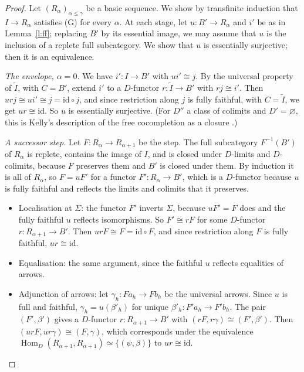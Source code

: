 \documentclass[11pt,a4paper]{amsart}
\theoremstyle{definition}
\theoremstyle{remark}
\newcommand{\Hom}{\operatorname{Hom}}
\begin{document}
\begin{proof}
Let $(R_\alpha)_{\alpha\le\gamma}$ be a basic sequence. We show by transfinite induction that $I\to R_\alpha$ satisfies (G) for every $\alpha$. At each stage, let $u\colon B'\to R_\alpha$ and $i'$ be as in Lemma~\ref{l:ff}; replacing $B'$ by its essential image, we may assume that $u$ is the inclusion of a replete full subcategory. We show that $u$ is essentially surjective; then it is an equivalence.

\emph{The envelope, $\alpha=0$.} We have $i'\colon I\to B'$ with $ui'\cong j$. By the universal property of $\widetilde I$, with $C=B'$, extend $i'$ to a $D$-functor $r\colon\widetilde I\to B'$ with $rj\cong i'$. Then $urj\cong ui'\cong j=\mathrm{id}\circ j$, and since restriction along $j$ is fully faithful, with $C=\widetilde I$, we get $ur\cong\mathrm{id}$. So $u$ is essentially surjective. (For $D''$ a class of colimits and $D'=\varnothing$, this is Kelly's description of the free cocompletion as a closure \cite[Thm~5.35]{kellybook}.)

\emph{A successor step.} Let $F\colon R_\alpha\to R_{\alpha+1}$ be the step. The full subcategory $F^{-1}(B')$ of $R_\alpha$ is replete, contains the image of $I$, and is closed under $D$-limits and $D$-colimits, because $F$ preserves them and $B'$ is closed under them. By induction it is all of $R_\alpha$, so $F=uF'$ for a functor $F'\colon R_\alpha\to B'$, which is a $D$-functor because $u$ is fully faithful and reflects the limits and colimits that it preserves.
\begin{itemize}
\item Localisation at $\Sigma$: the functor $F'$ inverts $\Sigma$, because $uF'=F$ does and the fully faithful $u$ reflects isomorphisms. So $F'\cong rF$ for some $D$-functor $r\colon R_{\alpha+1}\to B'$. Then $urF\cong F=\mathrm{id}\circ F$, and since restriction along $F$ is fully faithful, $ur\cong\mathrm{id}$.
\item Equalisation: the same argument, since the faithful $u$ reflects equalities of arrows.
\item Adjunction of arrows: let $\gamma_h\colon Fa_h\to Fb_h$ be the universal arrows. Since $u$ is full and faithful, $\gamma_h=u(\beta'_h)$ for unique $\beta'_h\colon F'a_h\to F'b_h$. The pair $(F',\beta')$ gives a $D$-functor $r\colon R_{\alpha+1}\to B'$ with $(rF,r\gamma)\cong(F',\beta')$. Then $(urF,ur\gamma)\cong(F,\gamma)$, which corresponds under the equivalence $\Hom_D(R_{\alpha+1},R_{\alpha+1})\simeq\{(\psi,\beta)\}$ to $ur\cong\mathrm{id}$.
\end{itemize}


\end{proof}
\end{document}
